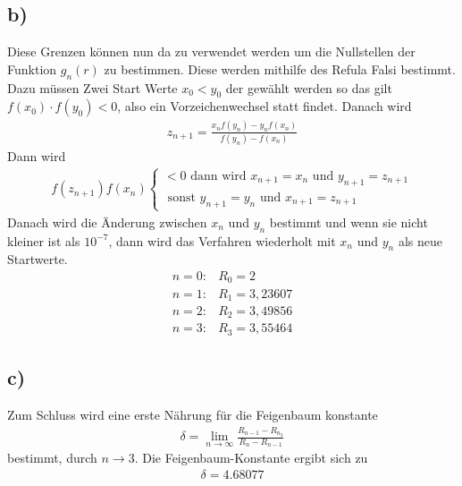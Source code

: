 \subsection*{b)}
	Diese Grenzen können nun da zu verwendet werden um die Nullstellen der Funktion $g_n(r)$ zu bestimmen.
	Diese werden mithilfe des Refula Falsi bestimmt.
	Dazu müssen Zwei Start Werte $x_0<y_0$ der gewählt werden so das gilt $f(x_0)\cdot f(y_0)< 0$, also ein Vorzeichenwechsel statt findet. 
	Danach wird 
	\begin{align*}
		z_{n+1}=\frac{x_nf(y_n)-y_nf(x_n)}{f(y_n)-f(x_n)}
	\end{align*}
	Dann wird 
	\begin{align*}
	f(z_{n+1})f(x_n)\begin{cases}
		<0 \text{ dann wird } x_{n+1}=x_n\text{ und } y_{n+1}=z_{n+1}\\
		\text{ sonst }y_{n+1}=y_n\text{ und } x_{n+1}=z_{n+1}
	\end{cases}
	\end{align*}
	Danach wird die Änderung zwischen $x_n$ und $y_n$ bestimmt und wenn sie nicht kleiner ist als $10^{-7}$, dann wird das Verfahren wiederholt mit $x_n$ und $y_n$ als neue Startwerte.
%	
	\begin{align*}
	n=0:& R_0=2\\
	n=1:& R_1=3,23607\\
	n=2:& R_2=3,49856\\
	n=3:& R_3=3,55464
	\end{align*}
	\subsection*{c)}
	Zum Schluss wird eine erste Nährung für die Feigenbaum konstante 
	\begin{align*}
		\delta = \lim\limits_{n\to\infty}\frac{R_{n-1}-R_{n_2}}{R_{n}-R_{n-1}}
	\end{align*}
	bestimmt, durch $n\to3$.
	Die Feigenbaum-Konstante ergibt sich zu
	\begin{align*}
		\delta = 4.68077
	\end{align*} 
	